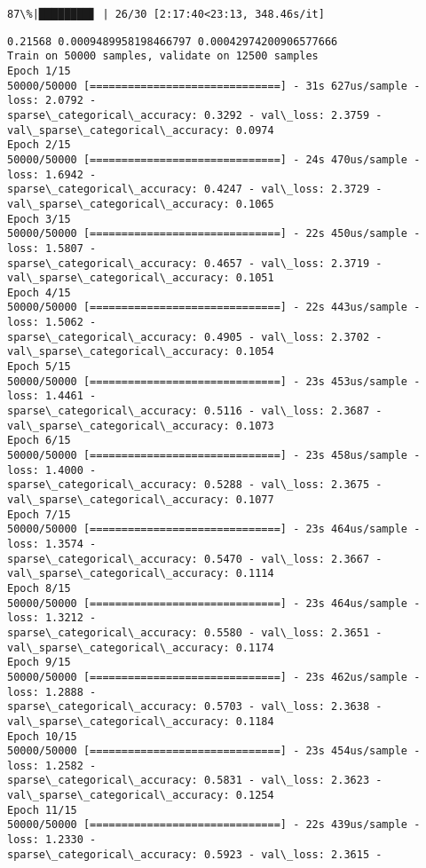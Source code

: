 \documentclass[11pt]{article}
\begin{document}
    \begin{Verbatim}[commandchars=\\\{\}]
 87\%|████████▋ | 26/30 [2:17:40<23:13, 348.46s/it]
    \end{Verbatim}

    \begin{Verbatim}[commandchars=\\\{\}]
0.21568 0.0009489958198466797 0.00042974200906577666
Train on 50000 samples, validate on 12500 samples
Epoch 1/15
50000/50000 [==============================] - 31s 627us/sample - loss: 2.0792 -
sparse\_categorical\_accuracy: 0.3292 - val\_loss: 2.3759 -
val\_sparse\_categorical\_accuracy: 0.0974
Epoch 2/15
50000/50000 [==============================] - 24s 470us/sample - loss: 1.6942 -
sparse\_categorical\_accuracy: 0.4247 - val\_loss: 2.3729 -
val\_sparse\_categorical\_accuracy: 0.1065
Epoch 3/15
50000/50000 [==============================] - 22s 450us/sample - loss: 1.5807 -
sparse\_categorical\_accuracy: 0.4657 - val\_loss: 2.3719 -
val\_sparse\_categorical\_accuracy: 0.1051
Epoch 4/15
50000/50000 [==============================] - 22s 443us/sample - loss: 1.5062 -
sparse\_categorical\_accuracy: 0.4905 - val\_loss: 2.3702 -
val\_sparse\_categorical\_accuracy: 0.1054
Epoch 5/15
50000/50000 [==============================] - 23s 453us/sample - loss: 1.4461 -
sparse\_categorical\_accuracy: 0.5116 - val\_loss: 2.3687 -
val\_sparse\_categorical\_accuracy: 0.1073
Epoch 6/15
50000/50000 [==============================] - 23s 458us/sample - loss: 1.4000 -
sparse\_categorical\_accuracy: 0.5288 - val\_loss: 2.3675 -
val\_sparse\_categorical\_accuracy: 0.1077
Epoch 7/15
50000/50000 [==============================] - 23s 464us/sample - loss: 1.3574 -
sparse\_categorical\_accuracy: 0.5470 - val\_loss: 2.3667 -
val\_sparse\_categorical\_accuracy: 0.1114
Epoch 8/15
50000/50000 [==============================] - 23s 464us/sample - loss: 1.3212 -
sparse\_categorical\_accuracy: 0.5580 - val\_loss: 2.3651 -
val\_sparse\_categorical\_accuracy: 0.1174
Epoch 9/15
50000/50000 [==============================] - 23s 462us/sample - loss: 1.2888 -
sparse\_categorical\_accuracy: 0.5703 - val\_loss: 2.3638 -
val\_sparse\_categorical\_accuracy: 0.1184
Epoch 10/15
50000/50000 [==============================] - 23s 454us/sample - loss: 1.2582 -
sparse\_categorical\_accuracy: 0.5831 - val\_loss: 2.3623 -
val\_sparse\_categorical\_accuracy: 0.1254
Epoch 11/15
50000/50000 [==============================] - 22s 439us/sample - loss: 1.2330 -
sparse\_categorical\_accuracy: 0.5923 - val\_loss: 2.3615 -

\end{Verbatim}
\end{document}
